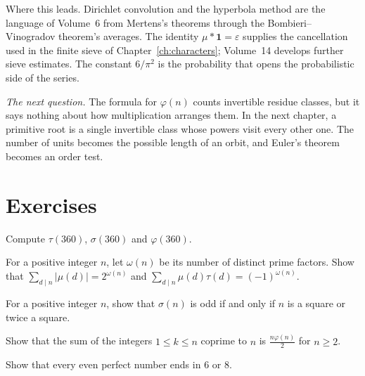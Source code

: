 \begin{beauty}
Where this leads. Dirichlet convolution and the hyperbola method are the language of Volume~6 from Mertens's theorems through the Bombieri--Vinogradov theorem's averages. The identity $\mu*\mathbf 1=\varepsilon$ supplies the cancellation used in the finite sieve of Chapter~\ref{ch:characters}; Volume~14 develops further sieve estimates. The constant $6/\pi^2$ is the probability that opens the probabilistic side of the series.
\end{beauty}

\medskip
\noindent\emph{The next question.} The formula for $\varphi(n)$ counts invertible residue classes, but it says nothing about how multiplication arranges them. In the next chapter, a primitive root is a single invertible class whose powers visit every other one. The number of units becomes the possible length of an orbit, and Euler's theorem becomes an order test.

\section{Exercises}

\begin{exercise}[$\star$]\label{ex:360}
Compute $\tau(360)$, $\sigma(360)$ and $\varphi(360)$.
\end{exercise}

\begin{exercise}[$\star$]\label{ex:muid}
For a positive integer $n$, let $\omega(n)$ be its number of distinct prime factors. Show that $\sum_{d\mid n}|\mu(d)|=2^{\omega(n)}$ and $\sum_{d\mid n}\mu(d)\tau(d)=(-1)^{\omega(n)}$.
\end{exercise}

\begin{exercise}[$\star\star$]\label{ex:sigmaodd}
For a positive integer $n$, show that $\sigma(n)$ is odd if and only if $n$ is a square or twice a square.
\end{exercise}

\begin{exercise}[$\star\star$]\label{ex:coprimesum}
Show that the sum of the integers $1\le k\le n$ coprime to $n$ is $\frac{n\varphi(n)}2$ for $n\ge2$.
\end{exercise}

\begin{exercise}[$\star\star$]\label{ex:even}
Show that every even perfect number ends in $6$ or $8$.
\end{exercise}

